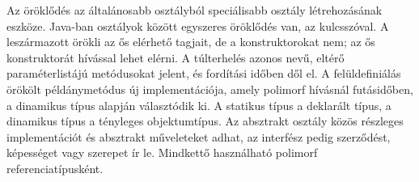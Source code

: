 \begin{summarybox}
Az öröklődés az általánosabb osztályból speciálisabb osztály létrehozásának eszköze. Java-ban osztályok között egyszeres öröklődés van, az  kulcsszóval. A leszármazott örökli az ős elérhető tagjait, de a konstruktorokat nem; az ős konstruktorát  hívással lehet elérni. A túlterhelés azonos nevű, eltérő paraméterlistájú metódusokat jelent, és fordítási időben dől el. A felüldefiniálás örökölt példánymetódus új implementációja, amely polimorf hívásnál futásidőben, a dinamikus típus alapján választódik ki. A statikus típus a deklarált típus, a dinamikus típus a tényleges objektumtípus. Az absztrakt osztály közös részleges implementációt és absztrakt műveleteket adhat, az interfész pedig szerződést, képességet vagy szerepet ír le. Mindkettő használható polimorf referenciatípusként.
\end{summarybox}
